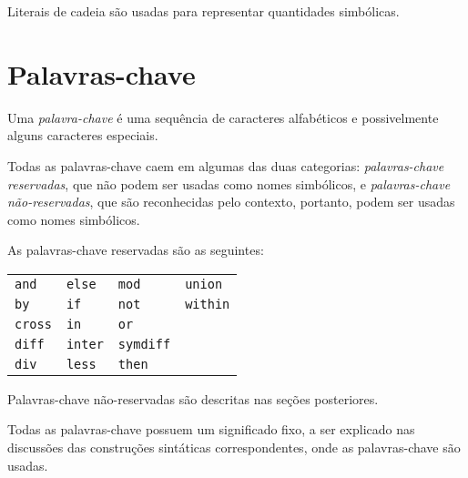 \documentclass[11pt, brazil]{report}
\begin{document}
Literais de cadeia são usadas para representar quantidades simbólicas.

\section{Palavras-chave}

Uma {\it palavra-chave} é uma sequência de caracteres alfabéticos e
possivelmente alguns caracteres especiais.


Todas as palavras-chave caem em algumas das duas categorias:
{\it palavras-chave reservadas}, que não podem ser usadas como nomes simbólicos,
e {\it palavras-chave não-reservadas}, que são reconhecidas pelo contexto,
portanto, podem ser usadas como nomes simbólicos.


As palavras-chave reservadas são as seguintes:

%

\noindent\hfil
\begin{tabular}{@{}p{.7in}p{.7in}p{.7in}p{.7in}@{}}
{\tt and}&{\tt else}&{\tt mod}&{\tt union}\\
{\tt by}&{\tt if}&{\tt not}&{\tt within}\\
{\tt cross}&{\tt in}&{\tt or}\\
{\tt diff}&{\tt inter}&{\tt symdiff}\\
{\tt div}&{\tt less}&{\tt then}\\
\end{tabular}

Palavras-chave não-reservadas são descritas nas seções posteriores.

Todas as palavras-chave possuem um significado fixo, a ser
explicado nas discussões das \linebreak construções sintáticas correspondentes,
onde as palavras-chave são usadas.

%
\end{document}
